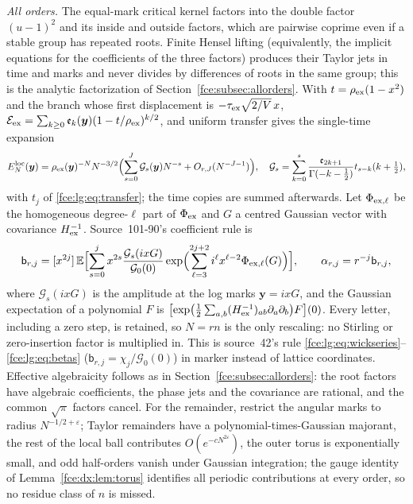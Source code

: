 \documentclass[11pt,a4paper]{article}
\numberwithin{equation}{section}
\theoremstyle{definition}\newtheorem{definition}[theorem]{Definition}
\theoremstyle{remark}\newtheorem{remark}[theorem]{Remark}
\newcommand{\E}{\mathcal E}
\newcommand{\Exp}{\mathbb E}
\begin{document}
\emph{All orders.} The equal-mark critical kernel factors into the double
factor $(u-1)^2$ and its inside and outside factors, which are pairwise
coprime even if a stable group has repeated roots. Finite Hensel lifting
(equivalently, the implicit equations for the coefficients of the three
factors) produces their Taylor jets in time and marks and never divides by
differences of roots in the same group; this is the analytic factorization of
Section~\ref{fce:subsec:allorders}. With $t=\rho_{\rm ex}(1-x^2)$ and the
branch whose first displacement is $-\tau_{\rm ex}\sqrt{2/V}\,x$,
$\E_{\rm ex}=\sum_{k\ge0}\mathfrak e_k(\boldsymbol y)(1-t/\rho_{\rm ex})^{k/2}$,
and uniform transfer gives the single-time expansion
\begin{equation}\label{fce:dx:eq:transfer}
 E^{\rm loc}_N(\boldsymbol y)=\rho_{\rm ex}(\boldsymbol y)^{-N}N^{-3/2}
 \Bigl(\sum_{s=0}^J\mathcal G_s(\boldsymbol y)N^{-s}+O_{r,J}(N^{-J-1})\Bigr),\quad
 \mathcal G_s=\sum_{k=0}^s\frac{\mathfrak e_{2k+1}}{\Gamma(-k-\frac12)}t_{s-k}(k+\tfrac12),
\end{equation}
with $t_j$ of \eqref{fce:lg:eq:transfer}; the time copies are summed
afterwards. Let $\Phi_{{\rm ex},\ell}$ be the homogeneous degree-$\ell$ part of
$\Phi_{\rm ex}$ and $G$ a centred Gaussian vector with covariance
$H_{\rm ex}^{-1}$. Source~101-90's coefficient rule is
\begin{equation}\label{fce:dx:eq:recipe}
 \mathsf b_{r,j}=[x^{2j}]\,\Exp\Bigl[\sum_{s=0}^jx^{2s}
 \frac{\mathcal G_s(ixG)}{\mathcal G_0(0)}
 \exp\Bigl(\sum_{\ell=3}^{2j+2}i^\ell x^{\ell-2}\Phi_{{\rm ex},\ell}(G)\Bigr)\Bigr],
 \qquad \alpha_{r,j}=r^{-j}\mathsf b_{r,j},
\end{equation}
where $\mathcal G_s(ixG)$ is the amplitude at the log marks
$\boldsymbol y=ixG$, and the Gaussian expectation of a polynomial $F$ is
$\bigl[\exp\bigl(\frac12\sum_{a,b}(H_{\rm ex}^{-1})_{ab}\partial_a\partial_b\bigr)F\bigr](0)$.
Every letter, including a zero step, is retained, so $N=rn$ is the only
rescaling: no Stirling or zero-insertion factor is multiplied in. This is
source~42's rule \eqref{fce:lg:eq:wickseries}--\eqref{fce:lg:eq:betas}
($\mathsf b_{r,j}=\chi_j/\mathcal G_0(0)$) in marker instead of lattice
coordinates. Effective algebraicity follows as in
Section~\ref{fce:subsec:allorders}: the root factors have algebraic
coefficients, the phase jets and the covariance are rational, and the common
$\sqrt\pi$ factors cancel. For the remainder, restrict the angular marks to
radius $N^{-1/2+\varepsilon}$; Taylor remainders have a
polynomial-times-Gaussian majorant, the rest of the local ball contributes
$O(e^{-cN^{2\varepsilon}})$, the outer torus is exponentially small, and odd
half-orders vanish under Gaussian integration; the gauge identity of
Lemma~\ref{fce:dx:lem:torus} identifies all periodic contributions at every
order, so no residue class of $n$ is missed.
\end{document}
